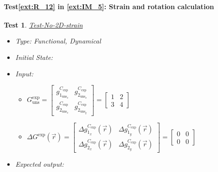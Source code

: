 \documentclass[12pt, titlepage]{article}
\newtheorem{Test}{Test}
\begin{document}
\paragraph{Test\cref{ext:R_12} in \cref{ext:IM_5}: Strain and rotation calculation}						

\begin{Test}\normalfont\underline{Test-No-2D-strain}
\label{T_No-2D-strain}
\begin{itemize}
\item Type: Functional, Dynamical
\item Initial State:
\item Input:
\begin{itemize}
	\item $G_{\text{uns}}^{\text{exp}} =
	\begin{bmatrix}
	g_{1_{{\text{uns}}_x}}^{C_{\text{exp}}} & g_{2_{{\text{uns}}_x}}^{C_{\text{exp}}} \\
	g_{2_{{\text{uns}}_x}}^{C_{\text{exp}}} & g_{2_{{\text{uns}}_y}}^{C_{\text{exp}}} 
	\end{bmatrix} =\begin{bmatrix}
	1 & 2 \\
	3 & 4 
	\end{bmatrix} $
	\item $\Delta G^{\text{exp}}(\vec{r})=
	\begin{bmatrix}
	\Delta g_{1_{x}}^{C_{\text{exp}}}(\vec{r}) & \Delta g_{1_{y}}^{C_{\text{exp}}}(\vec{r}) \\
	\Delta g_{2_{x}}^{C_{\text{exp}}}(\vec{r}) & \Delta g_{2_{y}}^{C_{\text{exp}}}(\vec{r})
	\end{bmatrix} = \begin{bmatrix}
	0 & 0 \\
	0 & 0 
	\end{bmatrix} $
	\end{itemize} 
\item Expected output:
\end{itemize}
\end{Test}
\end{document}
